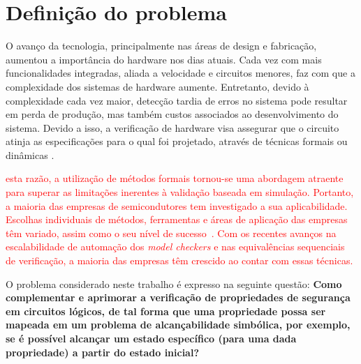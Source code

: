 \section{Definição do problema}

O avanço da tecnologia, principalmente nas áreas de design e fabricação, aumentou a importância do hardware nos dias atuais. Cada vez com mais funcionalidades integradas, aliada a velocidade e circuitos menores, faz com que a complexidade dos sistemas de hardware aumente. Entretanto, devido à complexidade cada vez maior, detecção tardia de erros no sistema pode resultar em perda de produção, mas também custos associados ao desenvolvimento do sistema\cite{gupta1992formal}. Devido a isso, a verificação de hardware visa assegurar que o circuito atinja as especificações para o qual foi projetado, através de técnicas formais ou dinâmicas \cite{boule2007efficient}.



\textcolor{red}{ esta razão, a utilização de métodos formais tornou-se uma abordagem atraente para superar as limitações inerentes à validação baseada em simulação. Portanto, a maioria das empresas de semicondutores tem investigado a sua aplicabilidade. Escolhas individuais de métodos, ferramentas e áreas de aplicação das empresas têm variado, assim como o seu nível de sucesso~\cite{cabodi2016hardware}. Com os recentes avanços na escalabilidade de automação dos \textit{model checkers} e nas equivalências sequenciais de verificação, a maioria das empresas têm crescido ao contar com essas técnicas\cite{clarke2008birth}.}

O problema considerado neste trabalho é expresso na seguinte questão: \textbf{Como complementar e aprimorar a verificação de propriedades de segurança em circuitos lógicos, de tal forma que uma propriedade possa ser mapeada em um problema de alcançabilidade simbólica, por exemplo, se é possível alcançar um estado específico (para uma dada propriedade) a partir do estado inicial?}


